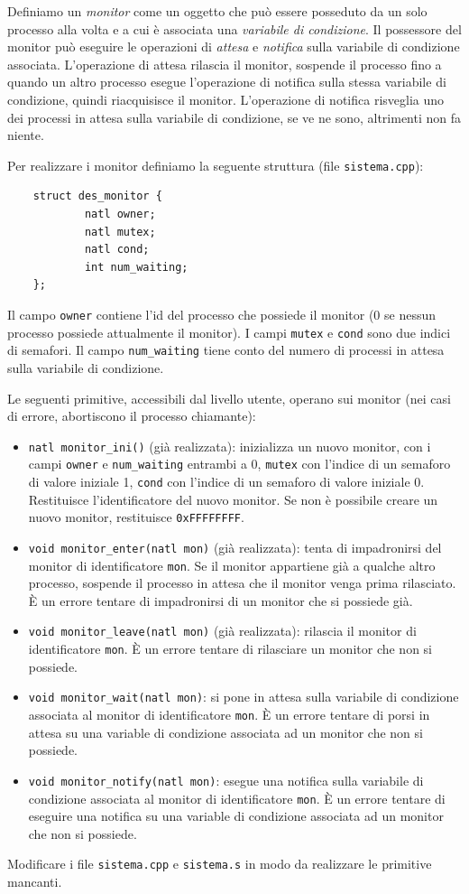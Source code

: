Definiamo un {\em monitor} come un oggetto che pu\`o essere posseduto da un solo processo alla volta e a cui \`e associata
una {\em variabile di condizione}. Il possessore del monitor pu\`o eseguire le operazioni di {\em attesa} e {\em notifica} sulla variabile di condizione
associata. L'operazione di attesa rilascia il monitor, sospende il processo fino a quando un altro processo esegue l'operazione di notifica
sulla stessa variabile di condizione, quindi riacquisisce il monitor. L'operazione di notifica risveglia uno dei processi in attesa sulla
variabile di condizione, se ve ne sono, altrimenti non fa niente.

Per realizzare i monitor definiamo la seguente struttura (file {\tt sistema.cpp}):

\begin{verbatim}
    struct des_monitor {
            natl owner;
            natl mutex;
            natl cond;
            int num_waiting;
    };
\end{verbatim}

Il campo {\tt owner} contiene l'id del processo che possiede il monitor (0 se nessun processo possiede attualmente il monitor).
I campi {\tt mutex} e {\tt cond} sono due indici di semafori. Il campo \verb|num_waiting| tiene conto del numero di processi
in attesa sulla variabile di condizione.

Le seguenti primitive, accessibili dal livello utente, operano sui monitor (nei casi di errore, abortiscono il processo chiamante):
\begin{itemize}
\item \verb|natl monitor_ini()| (gi\`a realizzata): inizializza un nuovo monitor, con i campi {\tt owner} e \verb|num_waiting| entrambi a 0, 
{\tt mutex} con l'indice di un semaforo di valore iniziale 1, {\tt cond} con l'indice di un semaforo di valore iniziale 0.
Restituisce l'identificatore del nuovo monitor. Se non \`e possibile creare un nuovo monitor, restituisce {\tt 0xFFFFFFFF}.
\item \verb|void monitor_enter(natl mon)| (gi\`a realizzata): tenta di impadronirsi del monitor di identificatore {\tt mon}.
Se il monitor appartiene gi\`a a qualche altro processo, sospende il processo in attesa che il monitor venga prima rilasciato.
\`E un errore tentare di impadronirsi di un monitor che si possiede gi\`a.
\item \verb|void monitor_leave(natl mon)| (gi\`a realizzata): rilascia il monitor di identificatore {\tt mon}.
\`E un errore tentare di rilasciare un monitor che non si possiede.
\item \verb|void monitor_wait(natl mon)|: si pone in attesa sulla variabile di condizione associata al monitor di identificatore {\tt mon}.
\`E un errore tentare di porsi in attesa su una variable di condizione associata ad un monitor che non si possiede.
\item \verb|void monitor_notify(natl mon)|: esegue una notifica sulla variabile di condizione associata al monitor di identificatore {\tt mon}.
\`E un errore tentare di eseguire una notifica su una variable di condizione associata ad un monitor che non si possiede.
\end{itemize}

Modificare i file \verb|sistema.cpp| e \verb|sistema.s| 
in modo da realizzare le primitive mancanti.
